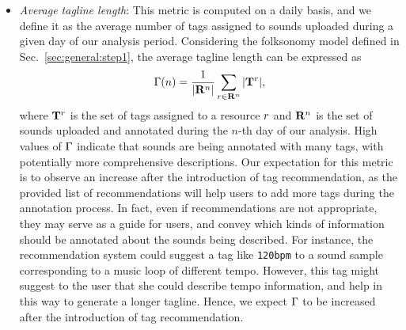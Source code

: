 \begin{itemize}

	\item \textit{Average tagline length}: This metric is computed on a daily basis, and we define it as the average number of tags assigned to sounds uploaded during a given day of our analysis period. Considering the folksonomy model defined in Sec.~\ref{sec:general:step1}, the average tagline length can be expressed as
\begin{equation} \Gamma(n) =  \frac{1}{|\mathbf{R}^n|}\sum\limits_{r\in \mathbf{R}^n}{|\mathbf{T}^r|}, \label{impact:eq:average_tagline_length} \end{equation}
where $\mathbf{T}^r$ is the set of tags assigned to a resource $r$ and $\mathbf{R}^n$ is the set of sounds uploaded and annotated during the $n$-th day of our analysis. High values of $\Gamma$ indicate that sounds are being annotated with many tags, with potentially more comprehensive descriptions. Our expectation for this metric is to observe an increase after the introduction of tag recommendation, as the provided list of recommendations will help users to add more tags during the annotation process. In fact, even if recommendations are not appropriate, they may serve as a guide for users, and convey which kinds of information should be annotated about the sounds being described. For instance, the recommendation system could suggest a tag like \texttt{120bpm} to a sound sample corresponding to a music loop of different tempo. However, this tag might suggest to the user that she could describe tempo information, and help in this way to generate a longer tagline. %
Hence, we expect $\Gamma$ to be increased after the introduction of tag recommendation.



\end{itemize}

